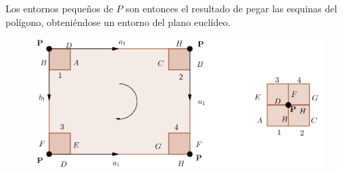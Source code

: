 \documentclass[GTS.tex]{subfiles}
\begin{document}
\begin{observacion}
\begin{center}
\end{center}
Los entornos pequeños de $P$ son entonces el resultado de pegar las esquinas del polígono, obteniéndose un entorno del plano euclídeo.
\begin{figure}[h!]
	\includegraphics[scale=0.26]{entorno}
\end{figure}

\end{observacion}
\end{document}
